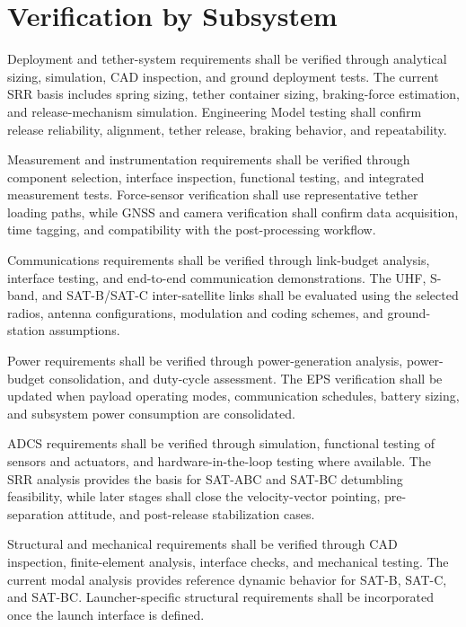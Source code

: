 \section{Verification by Subsystem}
\label{sec:verification_by_subsystem}

Deployment and tether-system requirements shall be verified through analytical sizing, simulation, CAD inspection, and ground deployment tests. The current SRR basis includes spring sizing, tether container sizing, braking-force estimation, and release-mechanism simulation. Engineering Model testing shall confirm release reliability, alignment, tether release, braking behavior, and repeatability.

Measurement and instrumentation requirements shall be verified through component selection, interface inspection, functional testing, and integrated measurement tests. Force-sensor verification shall use representative tether loading paths, while GNSS and camera verification shall confirm data acquisition, time tagging, and compatibility with the post-processing workflow.

Communications requirements shall be verified through link-budget analysis, interface testing, and end-to-end communication demonstrations. The UHF, S-band, and SAT-B/SAT-C inter-satellite links shall be evaluated using the selected radios, antenna configurations, modulation and coding schemes, and ground-station assumptions.

Power requirements shall be verified through power-generation analysis, power-budget consolidation, and duty-cycle assessment. The EPS verification shall be updated when payload operating modes, communication schedules, battery sizing, and subsystem power consumption are consolidated.

ADCS requirements shall be verified through simulation, functional testing of sensors and actuators, and hardware-in-the-loop testing where available. The SRR analysis provides the basis for SAT-ABC and SAT-BC detumbling feasibility, while later stages shall close the velocity-vector pointing, pre-separation attitude, and post-release stabilization cases.

Structural and mechanical requirements shall be verified through CAD inspection, finite-element analysis, interface checks, and mechanical testing. The current modal analysis provides reference dynamic behavior for SAT-B, SAT-C, and SAT-BC. Launcher-specific structural requirements shall be incorporated once the launch interface is defined.

